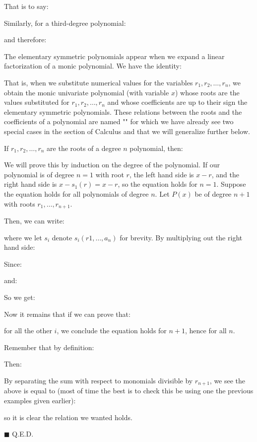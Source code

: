 	\pagebreak
	\begin{tcolorbox}[colframe=black,colback=white,sharp corners]
	That is to say:
	
	Similarly, for a third-degree polynomial:
	
	and therefore:
	
	\end{tcolorbox}

	The elementary symmetric polynomials appear when we expand a linear factorization of a monic polynomial. We have the identity:
	
	That is, when we substitute numerical values for the variables $r_1,r_2,\dots,r_n$, we obtain the monic univariate polynomial (with variable $x$) whose roots are the values substituted for $r_1,r_2,\dots,r_n$ and whose coefficients are up to their sign the elementary symmetric polynomials. These relations between the roots and the coefficients of a polynomial are named "" for which we have already see two special cases in the section of Calculus and that we will generalize further below.
	\begin{theorem}
	If $r_1,r_2,\ldots, r_n$ are the roots of a degree $n$ polynomial, then:
	
	\end{theorem}
	\begin{dem}
	We will prove this by induction on the degree of the polynomial. If our polynomial is of degree $n = 1$ with root $r$, the left hand side is $x-r$, and the right hand side is $x-s_1(r)= x-r$, so the equation holds for $n = 1$. Suppose the equation holds for all polynomials of degree $n$. Let $P(x)$ be of degree $n+1$ with roots $r_1,\ldots,r_{n+1}$.

    Then, we can write:
    
	where we let $s_i$ denote $s_i(r1, \ldots , a_n)$ for brevity. By multiplying out the right hand side:
	
	Since:
	
	and:
	
	So we get:
	
	Now it remains that if we can prove that:
	
	for all the other $i$, we conclude the equation holds for $n+1$, hence for all $n$.
	
	Remember that by definition:
	
	Then:
	
	By separating the sum with respect to monomials divisible by $r_{n+1}$, we see the above is equal to (most of time the best is to check this be using one the previous examples given earlier):
	
	so it is clear the relation we wanted holds.
	\begin{flushright}
		$\blacksquare$  Q.E.D.
	\end{flushright}
	\end{dem}
	
